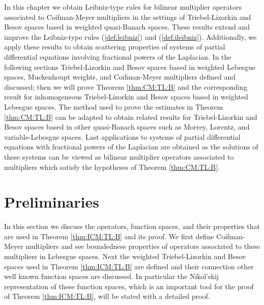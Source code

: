                                                                                                                                                                                                                                                                                                                                                                                                                

In this chapter we obtain Leibniz-type rules for bilinear multiplier operators associated to Coifman-Meyer multipliers in the settings of Triebel-Lizorkin and Besov spaces based in weighted quasi-Banach spaces. These results extend and improve the Leibniz-type rules (\ref{def:leibniz}) and (\ref{def:ileibniz}).  Additionally, we apply these results to obtain scattering properties of systems of partial differential equations involving fractional powers of the Laplacian. In the following sections Triebel-Lizorkin and Besov spaces based in weighted Lebesgue spaces, Muckenhoupt weights, and Coifman-Meyer multipliers defined and discussed; then we will prove Theorem \ref{thm:CM:TL:B} and the corresponding result for inhomogeneous Triebel-Lizorkin and Besov spaces based in weighted Lebesgue spaces. The method used to prove the estimates in Theorem \ref{thm:CM:TL:B} can be adapted to obtain related results for Triebel-Lizorkin and Besov spaces based in other quasi-Banach spaces such as Morrey, Lorentz, and variable-Lebesgue spaces. Last applications to systems of partial differential equations with fractional powers of the Laplacian are obtained as the solutions of these systems can be viewed as bilinear multiplier operators associated to multipliers which satisfy the hypotheses of Theorem \ref{thm:CM:TL:B}.

\section{Preliminaries}
In this section we discuss the operators, function spaces, and their properties that are used in Theorem \ref{thm:ICM:TL:B} and its proof. We first define Coifman-Meyer multipliers and see boundedness properties of operators associated to these multipliers in Lebesgue spaces. Next the weighted Triebel-Lizorkin and Besov spaces used in Theorem \ref{thm:ICM:TL:B} are defined and their connection other well known function spaces are discussed. In particular the Nikol'skij representation of these function spaces, which is an important tool for the proof of Theorem \ref{thm:ICM:TL:B}, will be stated with a detailed proof.
